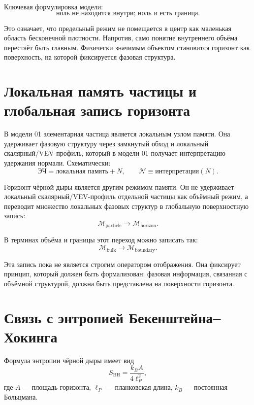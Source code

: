 \documentclass[11pt,a4paper]{article}
\newcommand{\normal}{\mathcal{N}}
\newcommand{\memory}{\mathcal{M}}
\newcommand{\bulk}{\mathrm{bulk}}
\newcommand{\boundary}{\mathrm{boundary}}
\begin{document}
Ключевая формулировка модели:
\begin{equation}
\text{ноль не находится внутри; ноль и есть граница.}
\end{equation}

Это означает, что предельный режим не помещается в центр как маленькая область бесконечной плотности. Напротив, само понятие внутреннего объёма перестаёт быть главным. Физически значимым объектом становится горизонт как поверхность, на которой фиксируется фазовая структура.

\section{Локальная память частицы и глобальная запись горизонта}

В модели 01 элементарная частица является локальным узлом памяти. Она удерживает фазовую структуру через замкнутый обход и локальный скалярный/VEV-профиль, который в модели 01 получает интерпретацию удержания нормали. Схематически:
\begin{equation}
\text{ЭЧ} = \text{локальная память} + N, \qquad \normal \equiv \text{интерпретация}(N).
\end{equation}

Горизонт чёрной дыры является другим режимом памяти. Он не удерживает локальный скалярный/VEV-профиль отдельной частицы как объёмный режим, а переводит множество локальных фазовых структур в глобальную поверхностную запись:
\begin{equation}
\memory_{\mathrm{particle}} \longrightarrow \memory_{\mathrm{horizon}}.
\end{equation}

В терминах объёма и границы этот переход можно записать так:
\begin{equation}
\memory_{\bulk} \longrightarrow \memory_{\boundary}.
\end{equation}

Эта запись пока не является строгим оператором отображения. Она фиксирует принцип, который должен быть формализован: фазовая информация, связанная с объёмной структурой, должна быть представлена на поверхности горизонта.

\section{Связь с энтропией Бекенштейна--Хокинга}

Формула энтропии чёрной дыры имеет вид
\begin{equation}
S_{\mathrm{BH}} = \frac{k_B A}{4\ell_P^2},
\end{equation}
где $A$ --- площадь горизонта, $\ell_P$ --- планковская длина, $k_B$ --- постоянная Больцмана.
\end{document}
